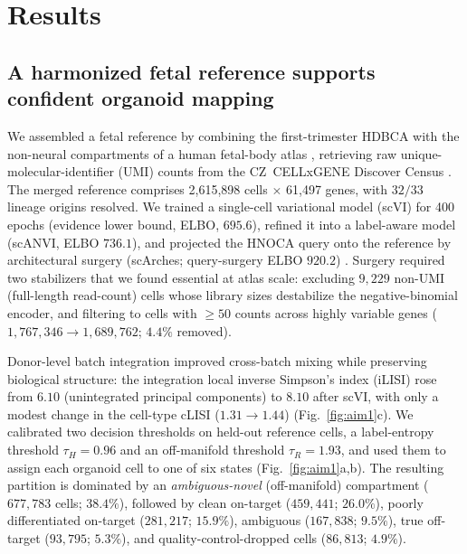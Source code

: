 \documentclass[11pt]{article}
\newcommand{\tauH}{\ensuremath{\tau_{H}}}
\newcommand{\tauR}{\ensuremath{\tau_{R}}}
\newcommand{\nref}{2{,}615{,}898}
\newcommand{\nquery}{1{,}767{,}346}
\begin{document}
\section{Results}

\subsection{A harmonized fetal reference supports confident organoid mapping}
We assembled a fetal reference by combining the first-trimester HDBCA \citep{braun2023hdbca} with the
non-neural compartments of a human fetal-body atlas \citep{cao2020fetal}, retrieving raw unique-molecular-identifier
(UMI) counts from the CZ~CELLxGENE Discover Census \citep{czi2025cellxgene}. The merged reference
comprises \nref{} cells $\times$ 61{,}497 genes, with $32/33$ lineage origins resolved. We trained a
single-cell variational model (scVI) for 400 epochs (evidence lower bound, ELBO, $695.6$), refined it
into a label-aware model (scANVI, ELBO $736.1$), and projected the HNOCA query onto the reference by
architectural surgery (scArches; query-surgery ELBO $920.2$) \citep{lopez2018scvi,xu2021scanvi,lotfollahi2022scarches,gayoso2022scvitools}.
Surgery required two stabilizers that we found essential at atlas scale: excluding $9{,}229$
non-UMI (full-length read-count) cells whose library sizes destabilize the negative-binomial encoder,
and filtering to cells with $\geq\!50$ counts across highly variable genes ($\nquery\rightarrow1{,}689{,}762$;
$4.4\%$ removed).

Donor-level batch integration improved cross-batch mixing while preserving biological structure:
the integration local inverse Simpson's index (iLISI) rose from $6.10$ (unintegrated principal
components) to $8.10$ after scVI, with only a modest change in the cell-type cLISI ($1.31\rightarrow1.44$)
\citep{korsunsky2019harmony,luecken2022scib} (Fig.~\ref{fig:aim1}c). We calibrated two decision
thresholds on held-out reference cells, a label-entropy threshold $\tauH=0.96$ and an off-manifold
threshold $\tauR=1.93$, and used them to assign each organoid cell to one of six states
(Fig.~\ref{fig:aim1}a,b). The resulting partition is dominated by an \emph{ambiguous-novel}
(off-manifold) compartment ($677{,}783$ cells; $38.4\%$), followed by clean on-target ($459{,}441$;
$26.0\%$), poorly differentiated on-target ($281{,}217$; $15.9\%$), ambiguous ($167{,}838$; $9.5\%$),
true off-target ($93{,}795$; $5.3\%$), and quality-control-dropped cells ($86{,}813$; $4.9\%$).
\end{document}
